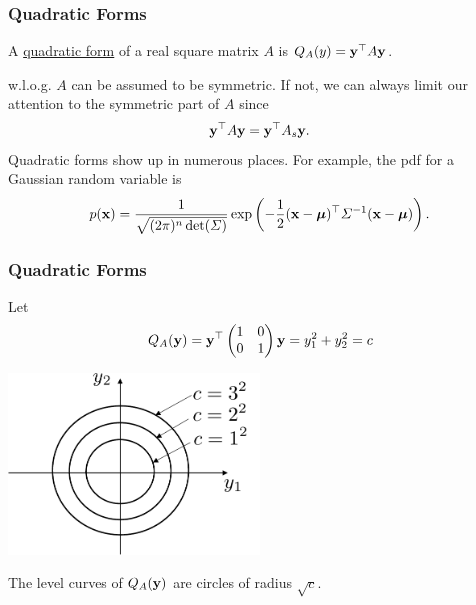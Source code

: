 \documentclass{beamer}
\begin{document}
\begin{frame}\frametitle{Quadratic Forms}
	\begin{definition}
		A \underline{quadratic form} of a real square matrix $A$ is $Q_A(y) = \mathbf{y}^\top A \mathbf{y}$.		
	\end{definition}
	
	w.l.o.g. $A$ can be assumed to be symmetric.  If not, we can always limit our attention to the symmetric part of $A$ since
	\[ 
		\mathbf{y}^\top A \mathbf{y} = \mathbf{y}^\top A_s \mathbf{y}. 
	\]
	Quadratic forms show up in numerous places.	For example, the pdf for a Gaussian random variable is 
	\[
	p(\mathbf{x}) = \frac{1}{\sqrt{(2\pi)^n\det(\Sigma)}}\exp\left(-\frac{1}{2}(\mathbf{x}-\boldsymbol{\mu})^\top \Sigma^{-1} (\mathbf{x}-\boldsymbol{\mu})\right).
	\]	
\end{frame}

\begin{frame}\frametitle{Quadratic Forms}
	\begin{example}
		Let 
		\[
			Q_A(\mathbf{y}) = \mathbf{y}^\top \begin{pmatrix} 1 & 0 \\ 0 & 1 \end{pmatrix} \mathbf{y} = y_1^2 + y_2^2 = c
		\]
		\begin{center}
			\includegraphics[width=0.5\textwidth]
				{figures/chap6_level_curve_circle}	
		\end{center}
		The level curves of $Q_A(\mathbf{y})$ are circles of radius $\sqrt{c}$.
	\end{example}
\end{frame}
\end{document}
